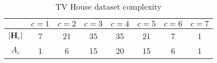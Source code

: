 \begin{table}[H]
\centering
\begin{tabular}{c|c|c|c|c|c|c|c|}
\cline{2-8}
                       & $c = 1$ & $c = 2$ & $c = 3$ & $c = 4$ & $c = 5$ & $c = 6$ & $c = 7$ \\ \hline
\multicolumn{1}{|c|}{$|\textbf{H}_c|$} &    7   &    21   &    35   &    35   &   21    &   7    &    1  \\ \hline
\multicolumn{1}{|c|}{$A_c$} &    1   &     6  &     15  &     20  &    15   &    6   &    1   \\ \hline
\end{tabular}
\caption{TV House dataset complexity}
\label{Tab:TvHouse}
\end{table}